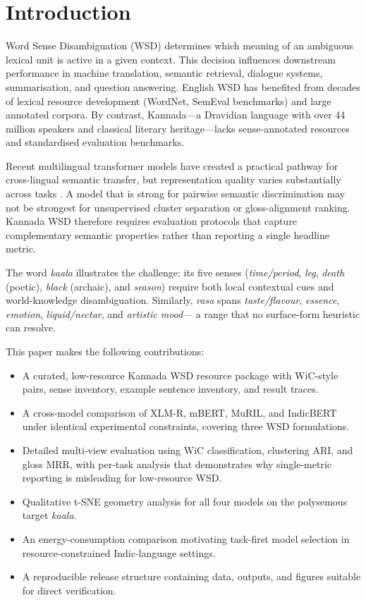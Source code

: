 \documentclass{ieeeaccess}
\begin{document}
\section{Introduction}
\label{sec:intro}

Word Sense Disambiguation (WSD) determines which meaning of an ambiguous
lexical unit is active in a given context.
This decision influences downstream performance in machine translation,
semantic retrieval, dialogue systems, summarisation, and question answering.
English WSD has benefited from decades of lexical resource development
(WordNet, SemEval benchmarks) and large annotated corpora.
By contrast, Kannada---a Dravidian language with over 44 million speakers
and classical literary heritage---lacks sense-annotated resources and
standardised evaluation benchmarks.

Recent multilingual transformer models have created a practical pathway for
cross-lingual semantic transfer, but representation quality varies
substantially across tasks \cite{devlin2019,conneau2020}.
A model that is strong for pairwise semantic discrimination may not be
strongest for unsupervised cluster separation or gloss-alignment ranking.
Kannada WSD therefore requires evaluation protocols that capture
complementary semantic properties rather than reporting a single headline
metric.

The word \textit{kaala} illustrates the challenge: its five senses
(\textit{time/period}, \textit{leg}, \textit{death} (poetic),
\textit{black} (archaic), and \textit{season}) require both local
contextual cues and world-knowledge disambiguation.
Similarly, \textit{rasa} spans \textit{taste/flavour}, \textit{essence},
\textit{emotion}, \textit{liquid/nectar}, and \textit{artistic mood}---
a range that no surface-form heuristic can resolve.

\medskip\noindent This paper makes the following contributions:
\begin{itemize}
  \item A curated, low-resource Kannada WSD resource package with
        WiC-style pairs, sense inventory, example sentence inventory,
        and result traces.
  \item A cross-model comparison of XLM-R, mBERT, MuRIL, and IndicBERT
        under identical experimental constraints, covering three WSD
        formulations.
  \item Detailed multi-view evaluation using WiC classification, clustering
        ARI, and gloss MRR, with per-task analysis that demonstrates why
        single-metric reporting is misleading for low-resource WSD.
  \item Qualitative t-SNE geometry analysis for all four models on the
        polysemous target \textit{kaala}.
  \item An energy-consumption comparison motivating task-first model
        selection in resource-constrained Indic-language settings.
  \item A reproducible release structure containing data, outputs, and
        figures suitable for direct verification.
\end{itemize}
\end{document}
